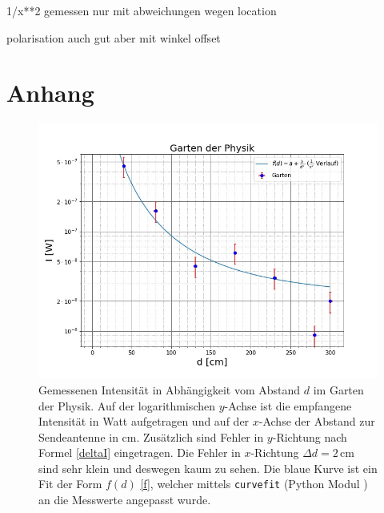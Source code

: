\documentclass[titlepage,11pt,a4paper,ngerman]{article}
\begin{document}
1/x**2 gemessen nur mit abweichungen wegen location

polarisation auch gut aber mit winkel offset






\pagebreak

\section*{Anhang}

\FloatBarrier

\begin{figure}[ht]
	\includegraphics[scale=0.55]{Bilder/Abstand-Garten.jpg}
	\centering
	\caption{Gemessenen Intensität in Abhängigkeit vom Abstand $d$ im Garten der Physik. Auf der logarithmischen $y$-Achse ist die empfangene Intensität in Watt aufgetragen und auf der $x$-Achse der Abstand zur Sendeantenne in cm. Zusätzlich sind Fehler in $y$-Richtung nach Formel \eqref{deltaI} eingetragen. Die Fehler in $x$-Richtung $\Delta d = 2\,$cm sind sehr klein und deswegen kaum zu sehen. Die blaue Kurve ist ein Fit der Form $f(d)$ \eqref{f}, welcher mittels \texttt{curvefit} (Python Modul \cite{curvescipy}) an die Messwerte angepasst wurde.}
	\label{Garten-A}
\end{figure}
\end{document}
